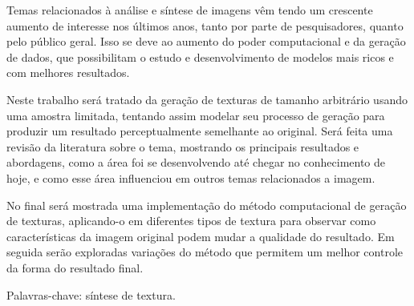 \setlength{\absparsep}{18pt} 
\begin{resumo}[Resumo]
 
Temas relacionados à análise e síntese de imagens vêm
tendo um crescente aumento de interesse nos últimos anos,
tanto por parte de pesquisadores, quanto pelo público geral.
Isso se deve ao aumento do poder computacional e da
geração de dados, que possibilitam o estudo e desenvolvimento
de modelos mais ricos e com melhores resultados.

Neste trabalho será tratado da geração de texturas de
tamanho arbitrário usando uma amostra limitada,
tentando assim modelar seu processo de geração para
produzir um resultado perceptualmente semelhante
ao original. Será feita uma revisão da literatura
sobre o tema, mostrando os principais resultados e
abordagens, como a área foi se desenvolvendo até
chegar no conhecimento de hoje, e como esse área
influenciou em outros temas relacionados a imagem.

No final será mostrada uma implementação do método
computacional de geração de texturas, aplicando-o
em diferentes tipos de textura para observar como
características da imagem original podem mudar a
qualidade do resultado. Em seguida serão exploradas
variações do método que permitem um melhor controle
da forma do resultado final.


 Palavras-chave: síntese de textura.
\end{resumo}

%
